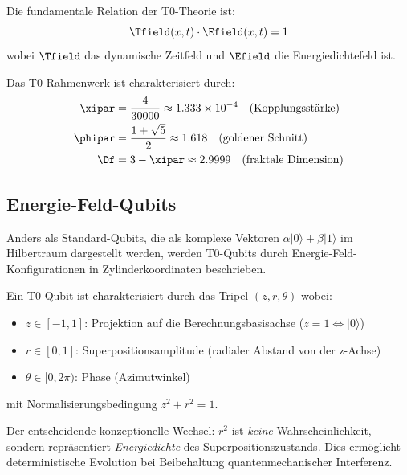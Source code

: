 \begin{definition}
	Die fundamentale Relation der T0-Theorie ist:
	\begin{equation}
		\Tfield(x,t) \cdot \Efield(x,t) = 1
		\label{eq:t0duality}
	\end{equation}
	wobei $\Tfield$ das dynamische Zeitfeld und $\Efield$ die Energiedichtefeld ist.
\end{definition}

\begin{definition}
	Das T0-Rahmenwerk ist charakterisiert durch:
	\begin{align}
		\xipar &= \frac{4}{30000} \approx 1.333 \times 10^{-4} \quad \text{(Kopplungsstärke)} \\
		\phipar &= \frac{1 + \sqrt{5}}{2} \approx 1.618 \quad \text{(goldener Schnitt)} \\
		\Df &= 3 - \xipar \approx 2.9999 \quad \text{(fraktale Dimension)}
	\end{align}
\end{definition}

\subsection{Energie-Feld-Qubits}

Anders als Standard-Qubits, die als komplexe Vektoren $\alpha|0\rangle + \beta|1\rangle$ im Hilbertraum dargestellt werden, werden T0-Qubits durch Energie-Feld-Konfigurationen in Zylinderkoordinaten beschrieben.

\begin{definition}[T0 Qubit]
	Ein T0-Qubit ist charakterisiert durch das Tripel $(z, r, \theta)$ wobei:
	\begin{itemize}
		\item $z \in [-1, 1]$: Projektion auf die Berechnungsbasisachse ($z=1 \Leftrightarrow |0\rangle$)
		\item $r \in [0, 1]$: Superpositionsamplitude (radialer Abstand von der z-Achse)
		\item $\theta \in [0, 2\pi)$: Phase (Azimutwinkel)
	\end{itemize}
	mit Normalisierungsbedingung $z^2 + r^2 = 1$.
\end{definition}

\begin{remark}
	Der entscheidende konzeptionelle Wechsel: $r^2$ ist \emph{keine} Wahrscheinlichkeit, sondern repräsentiert \emph{Energiedichte} des Superpositionszustands. Dies ermöglicht deterministische Evolution bei Beibehaltung quantenmechanischer Interferenz.
\end{remark}

